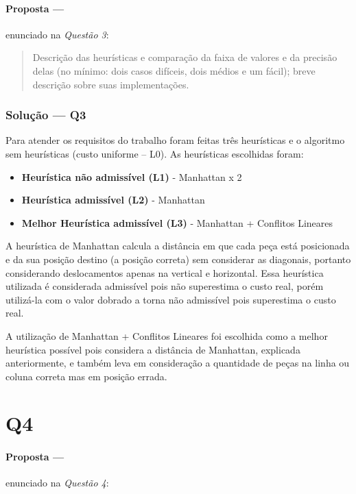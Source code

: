\documentclass[12pt]{article}
\begin{document}
\paragraph{Proposta ---} enunciado na \textit{Questão 3}:

\begin{quote}
Descrição das heurísticas e comparação da faixa de valores e da precisão delas (no mínimo: dois casos difíceis, dois médios e um fácil); breve descrição sobre suas implementações.
\end{quote}

\subsubsection{Solução --- \textbf{Q3}}

Para atender os requisitos do trabalho foram feitas três heurísticas e o algoritmo sem heurísticas (custo uniforme – L0). As heurísticas escolhidas foram:

\begin{itemize}
    \item \textbf{Heurística não admissível (L1)} - Manhattan x 2
    \item \textbf{Heurística admissível (L2)} - Manhattan
    \item \textbf{Melhor Heurística admissível (L3)} - Manhattan + Conflitos Lineares
\end{itemize}

A heurística de Manhattan calcula a distância em que cada peça está posicionada e da sua posição destino (a posição correta) sem considerar as diagonais, portanto considerando deslocamentos apenas na vertical e horizontal. Essa heurística utilizada é considerada admissível pois não superestima o custo real, porém utilizá-la com o valor dobrado a torna não admissível pois superestima o custo real.

A utilização de Manhattan + Conflitos Lineares foi escolhida como a melhor heurística possível pois considera a distância de Manhattan, explicada anteriormente, e também leva em consideração a quantidade de peças na linha ou coluna correta mas em posição errada.

\section{Q4}

\paragraph{Proposta ---} enunciado na \textit{Questão 4}:
\end{document}
